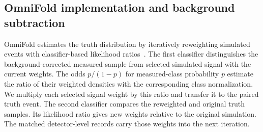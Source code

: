 \subsection{OmniFold implementation and background subtraction}
\label{sec:omnifold-implementation}
\label{sec:method}
\label{sec:method-algo}

OmniFold estimates the truth distribution by iteratively reweighting simulated events with classifier-based likelihood ratios~\cite{Andreassen:2019cjw,Andreassen:2021zzk}. The first classifier distinguishes the background-corrected measured sample from selected simulated signal with the current weights. The odds $p/(1-p)$ for measured-class probability $p$ estimate the ratio of their weighted densities with the corresponding class normalization. We multiply each selected signal weight by this ratio and transfer it to the paired truth event. The second classifier compares the reweighted and original truth samples. Its likelihood ratio gives new weights relative to the original simulation. The matched detector-level records carry those weights into the next iteration.

